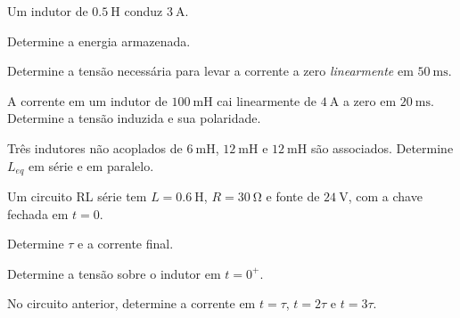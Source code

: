 \blocoaplicacao
\begin{questao}[2]{}

Um indutor de $\SI{0.5}{\henry}$ conduz $\SI{3}{\ampere}$.
\begin{itensq}
\item Determine a energia armazenada.
\item Determine a tensão necessária para levar a corrente a zero
      \emph{linearmente} em $\SI{50}{\milli\second}$.
\end{itensq}


\end{questao}
\begin{questao}[2]{}

A corrente em um indutor de $\SI{100}{\milli\henry}$ cai linearmente de
$\SI{4}{\ampere}$ a zero em $\SI{20}{\milli\second}$. Determine a tensão
induzida e sua polaridade.


\end{questao}
\begin{questao}[2]{}

Três indutores não acoplados de $\SI{6}{\milli\henry}$,
$\SI{12}{\milli\henry}$ e $\SI{12}{\milli\henry}$ são associados. Determine
$L_{eq}$ em série e em paralelo.


\end{questao}
\begin{questao}[2]{}

Um circuito RL série tem $L=\SI{0.6}{\henry}$, $R=\SI{30}{\ohm}$ e fonte de
$\SI{24}{\volt}$, com a chave fechada em $t=0$.
\begin{itensq}
\item Determine $\tau$ e a corrente final.
\item Determine a tensão sobre o indutor em $t=0^{+}$.
\end{itensq}


\end{questao}
\begin{questao}[2]{}

No circuito anterior, determine a corrente em $t=\tau$, $t=2\tau$ e
$t=3\tau$.


\end{questao}
